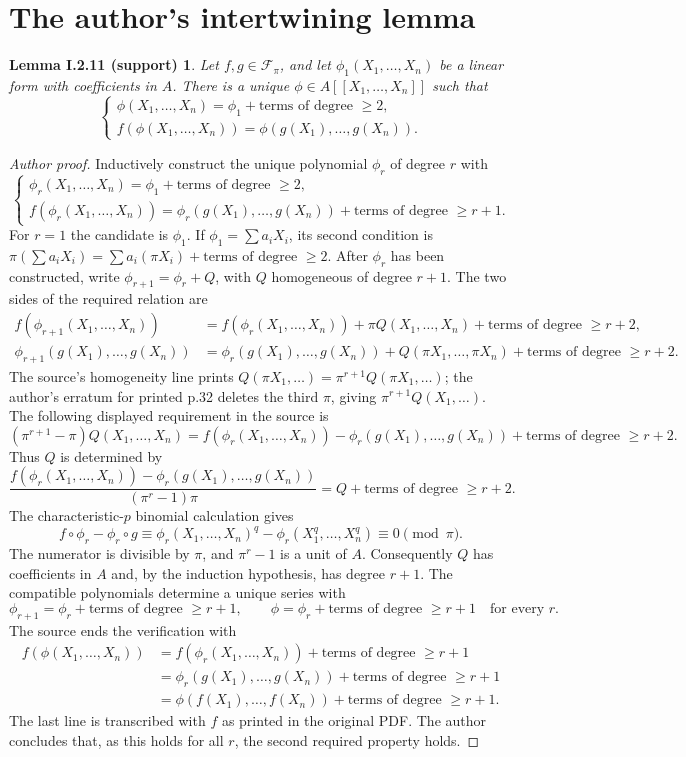 \documentclass[11pt]{article}
\newcommand{\terms}[1]{\text{terms of degree }\geq #1}
\newtheorem*{intertwiner}{Lemma I.2.11 (support)}
\begin{document}
\section*{The author's intertwining lemma}
\begin{intertwiner}
Let $f,g\in\mathcal F_\pi$, and let $\phi_1(X_1,\ldots,X_n)$ be a linear form
with coefficients in $A$. There is a unique $\phi\in A[[X_1,\ldots,X_n]]$ such that
\[
 \begin{cases}
 \phi(X_1,\ldots,X_n)=\phi_1+\terms{2},\\
 f(\phi(X_1,\ldots,X_n))=\phi(g(X_1),\ldots,g(X_n)).
 \end{cases}
\]
\end{intertwiner}
\begin{proof}[Author proof]
Inductively construct the unique polynomial $\phi_r$ of degree $r$ with
\[
 \begin{cases}
 \phi_r(X_1,\ldots,X_n)=\phi_1+\terms{2},\\
 f(\phi_r(X_1,\ldots,X_n))
 =\phi_r(g(X_1),\ldots,g(X_n))+\terms{r+1}.
 \end{cases}
\]
For $r=1$ the candidate is $\phi_1$. If $\phi_1=\sum a_iX_i$, its second
condition is $\pi(\sum a_iX_i)=\sum a_i(\pi X_i)+\terms{2}$.
After $\phi_r$ has been constructed, write $\phi_{r+1}=\phi_r+Q$, with $Q$
homogeneous of degree $r+1$. The two sides of the required relation are
\begin{align*}
 f(\phi_{r+1}(X_1,\ldots,X_n))
 &=f(\phi_r(X_1,\ldots,X_n))+\pi Q(X_1,\ldots,X_n)+\terms{r+2},\\
 \phi_{r+1}(g(X_1),\ldots,g(X_n))
 &=\phi_r(g(X_1),\ldots,g(X_n))+Q(\pi X_1,\ldots,\pi X_n)+\terms{r+2}.
\end{align*}
The source's homogeneity line prints
$Q(\pi X_1,\ldots)=\pi^{r+1}Q(\pi X_1,\ldots)$;
the author's erratum for printed p.32 deletes the third $\pi$, giving
$\pi^{r+1}Q(X_1,\ldots)$.
The following displayed requirement in the source is
\[
 (\pi^{r+1}-\pi)Q(X_1,\ldots,X_n)
 =f(\phi_r(X_1,\ldots,X_n))-\phi_r(g(X_1),\ldots,g(X_n))
 +\terms{r+2}.
\]
Thus $Q$ is determined by
\[
 \frac{f(\phi_r(X_1,\ldots,X_n))-\phi_r(g(X_1),\ldots,g(X_n))}
 {(\pi^r-1)\pi}
 =Q+\terms{r+2}.
\]
The characteristic-$p$ binomial calculation gives
\[
 f\circ\phi_r-\phi_r\circ g
 \equiv\phi_r(X_1,\ldots,X_n)^q-\phi_r(X_1^q,\ldots,X_n^q)
 \equiv0\pmod\pi.
\]
The numerator is divisible by $\pi$, and $\pi^r-1$ is a unit of $A$.
Consequently $Q$ has coefficients in $A$ and, by the induction hypothesis,
has degree $r+1$. The compatible polynomials determine a unique series with
\[
 \phi_{r+1}=\phi_r+\terms{r+1},\qquad
 \phi=\phi_r+\terms{r+1}\quad\text{for every }r.
\]
The source ends the verification with
\begin{align*}
 f(\phi(X_1,\ldots,X_n))
 &=f(\phi_r(X_1,\ldots,X_n))+\terms{r+1}\\
 &=\phi_r(g(X_1),\ldots,g(X_n))+\terms{r+1}\\
 &=\phi(f(X_1),\ldots,f(X_n))+\terms{r+1}.
\end{align*}
The last line is transcribed with $f$ as printed in the original PDF.
The author concludes that, as this holds for all $r$, the second required property holds.
\end{proof}
\end{document}
